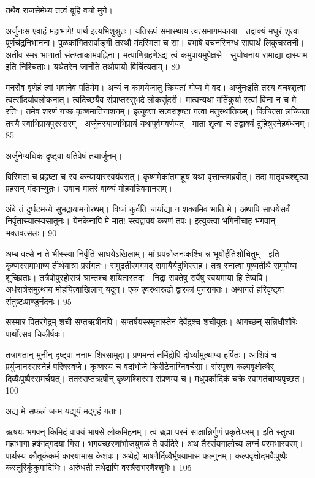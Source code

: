   तथैव राजसेमेध्य तत्वं ब्रूहि वचो मुने।

अर्जुनःस एवाहं महाभागे! पार्थ इत्यभिशुश्रुतः।
 यतिरूपं समास्थाय त्वत्समागमकाया।
 तद्वाक्यं मधुरं शृत्वा पूर्णचंद्रनिभानना।
 पुळकांगितसर्वाङ्गी तस्थौ मंदस्मिता च सा।
 बभाषे वचनंस्निग्धं सापार्थं लिकुचस्तनी।
 अतीव स्मर भाणार्ता संतप्ताकामवह्निना।
 मत्पाणिग्रहणेऽद्य त्वं कमुपायमुपेक्षसे।
 सुयोधनाय रामाद्या दास्याम इति निश्चिताः।
 यथेतरेन जानंति तथोपायो विचिंत्यताम्।
 80

  मनसैव वृणेहं त्वां भवानेव पतिर्मम।
 अन्यं न कामयेजातु क्रियतां गोप्य मे वद।
 अर्जुनःइति तस्य वचश्शृत्वा त्वत्सौंदर्यावलोकनात्।
 त्वदिच्छयैव संप्राप्तस्सुभद्रे लोकसुंदरी।
 मात्वन्यथा मतिंकुर्या स्त्वां विना न च मे रतिः।
 तमेव शरणं गच्छ कृष्णमातिनाशनम्।
 इत्युक्ता सत्वराहृष्टा गत्वा मतुरथांतिकम्।
 किंचित्सा लज्जिता तस्यै स्वाभिप्रायपुरस्सरम्।
 अर्जुनस्याप्यभिप्रायं यथापूर्वमवर्णयत्।
 माता शृत्वा च तद्वाक्यं दुहित्रुस्नेहबंधनम्।
 85

  अर्जुनेप्यधिकं दृष्ट्वा यतिवेषं तथार्जुनम्।

विस्मिता च प्रहृष्टा च स्व कन्यायास्स्वयंवरात्।
 कृष्णमेकांतमाहूय यथा वृत्तान्तमब्रवीत्।
 तदा मातृवचश्शृत्वा प्रहसन् मंदमच्युतः।
 उवाच मातरं वाक्यं मोहयन्निवमानसम्।
 
अंबे तं दुर्घटमन्ये सुभद्रायामनोरथम्।
 विघ्नं कुर्वति चार्याद्या न शक्यमिव भाति मे।
 अथापि साधयेसर्वं निर्वृतास्यात्स्वसातुनः।
 येनकेनापि मे मात! स्त्वद्वाक्यं करणं तपः।
 इत्युक्त्वा भगिनींचाह भगवान् भक्तवत्सलः।
 90

  अम्ब वत्से न ते भीस्स्या निर्वृतिं साधयेऽखिलाम्।
 मां प्रपन्नोजनःकश्चि न्न भूयोर्हतिशोचितुम्।
 इति कृष्णस्समाभाष्य तीर्थयात्रा प्रसंगतः।
 समुद्रतीरमगमद् रामायैर्यदुभिस्सह।
 तत्र स्नात्वा पुण्यतीर्थे समुपोष्य शुचिव्रताः।
 तत्रैवोपुरहोरात्रं श्रान्तश्च शयितास्तदा।
 निद्रा सक्तेषु सर्वेषु स्वयमाया हि तेष्वपि।
 अर्धरात्रेसमुत्थाय मोहयित्वाखिलान् यदून्।
 एक एवरथारूढो द्वारकां पुनरागतः।
 अथागतं हरिदृष्ट्वा संतुष्टःपाण्डुनंदनः।
 95

  सस्मार पितरंगेद्रम् शची सप्तऋषीनपि।
 सप्तर्षयस्स्मृतास्तेन देवेंद्रश्च शचीयुतः।
 आगच्छन् सन्निधौशौरेः पार्थोत्सव चिकीर्षवः।
 
तत्रागतान् मुनीन् दृष्ट्वा ननाम शिरसामुदा।
 प्रणमन्तं तमिंद्रोपि दोर्ध्यामुत्थाप्य हर्षितः।
 आशिषं च प्रयुंजानस्सस्नेहं परिषस्वजे।
 कृष्णस्य च वदांभोजे किरीटेनाग्निवर्चसा।
 संस्पृश्य कल्पवृक्षोत्थैर् दिव्यैःपुष्पैस्समर्चयत्।
 ततस्सप्तऋषीन् कृष्णश्शिरसा संप्रणम्य च।
 मधुपर्कादिकं चक्रे स्वागतंचाप्यपृच्छत।
 100

  अद्य मे सफलं जन्म यद्यूयं मद्गृहं गताः।
 
ऋषयः
भगवन् किमिदं वाक्यं भाषसे लोकमिहनम्।
 त्वं ब्रह्मा परमं साक्षान्निर्गुणं प्रकृतेःपरम्।
 इति स्तुत्वा महाभागा हर्षगद्गदया गिरा।
 भगवच्छरणांभोजयुगळं ते ववंदिरे।
 अथ तैस्संयगालोच्य लग्नं परमभास्वरम्।
 पार्थस्य कौतुकंकर्म कारयामास केशवः।
 अथेद्रो भाषणैर्दिव्यैर्भूषयामास फल्गुनम्।
 कल्पवृक्षोद्भवैःपुष्पैः कस्तूरिकुंकुमादिभिः।
 अरुंधती तथेद्राणि वस्त्रैराभरणैश्शुभैः।
 105


